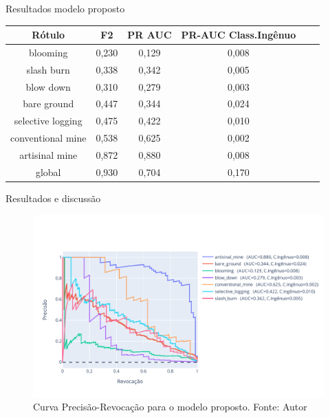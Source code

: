 \documentclass[8pt]{beamer}
\begin{document}
\begin{frame}{Resultados modelo proposto}
    \fontsize{7pt}{8pt}\selectfont
    \centering    
    \begin{tabular}{*{6}{c}}
        \hline
                     Rótulo &  F2    &   PR AUC &  PR-AUC Class.Ingênuo \\
        \hline
                  blooming &  0,230 &    0,129 &       0,008 \\
                slash burn &  0,338 &    0,342 &       0,005 \\
                 blow down &  0,310 &    0,279 &       0,003 \\
               bare ground &  0,447 &    0,344 &       0,024 \\
         selective logging &  0,475 &    0,422 &       0,010 \\
         conventional mine &  0,538 &    0,625 &       0,002 \\
            artisinal mine &  0,872 &    0,880 &       0,008 \\
                    global &  0,930 &    0,704 &       0,170 \\
        \hline
    \end{tabular}
\end{frame}     


\begin{frame}{Resultados e discussão}
    \begin{figure}[!ht]
        \centering
        \includegraphics[width=\columnwidth]{Imagens/results/rsp-swin-t_planet_pt/Curva PR para classes raras.pdf}
        \caption{ Curva Precisão-Revocação para o modelo proposto. Fonte: Autor}
        \label{fig:CurvaPRSwint}
    \end{figure}       
\end{frame}  
\end{document}

